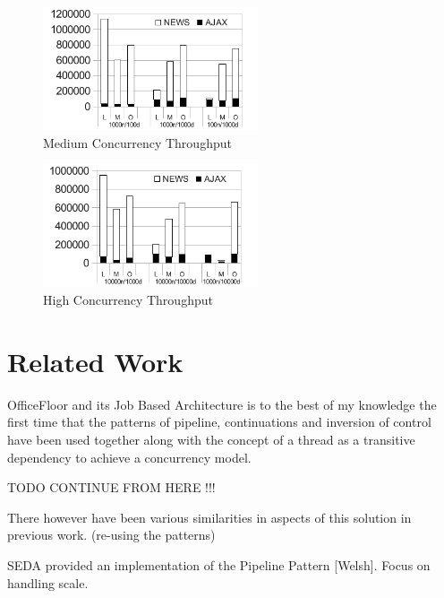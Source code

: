\documentclass[conference]{ieee/IEEEtran}
\begin{document}
\begin{figure}[!t]
\centering 
\includegraphics[width=2.5in]{MediumConcurrencyThroughput}
\caption{Medium Concurrency Throughput}
\label{fig:medium_concurrency_throughput}
\end{figure}

\begin{figure}[!t]
\centering 
\includegraphics[width=2.5in]{HighConcurrencyThroughput}
\caption{High Concurrency Throughput}
\label{fig:high_concurrency_throughput}
\end{figure}
  


\section{Related Work}
OfficeFloor and its Job Based Architecture is to the best of my knowledge the
first time that the patterns of pipeline, continuations and inversion of control
have been used together along with the concept of a thread as a transitive
dependency to achieve a concurrency model.

TODO CONTINUE FROM HERE !!!

There however have been various similarities in aspects of this solution in
previous work. (re-using the patterns)

SEDA provided an implementation of the Pipeline Pattern [Welsh]. Focus on
handling scale.
\end{document}
